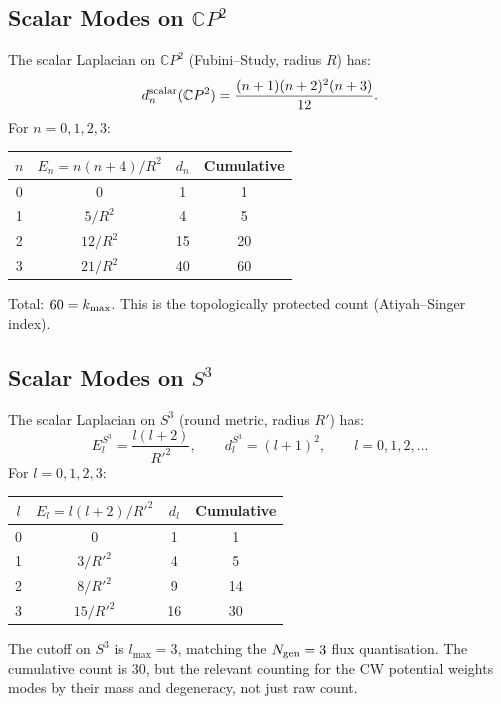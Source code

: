 \documentclass[11pt,a4paper]{article}
\newcommand{\CP}{\mathbb{C}P}
\newcommand{\kmax}{k_{\rm max}}
\newcommand{\Ngen}{N_{\rm gen}}
\begin{document}
\subsection{Scalar Modes on $\CP^2$}

The scalar Laplacian on $\CP^2$ (Fubini--Study, radius $R$) has:
\begin{equation}
d_n^{\rm scalar}(\CP^2) = \frac{(n+1)(n+2)^2(n+3)}{12}.
\end{equation}
For $n = 0,1,2,3$:

\begin{center}
\begin{tabular}{cccc}
\toprule
$n$ & $E_n = n(n+4)/R^2$ & $d_n$ & Cumulative \\
\midrule
0 & 0 & 1 & 1 \\
1 & $5/R^2$ & 4 & 5 \\
2 & $12/R^2$ & 15 & 20 \\
3 & $21/R^2$ & 40 & 60 \\
\bottomrule
\end{tabular}
\end{center}

Total: $60 = \kmax$. This is the topologically protected count
(Atiyah--Singer index).

\subsection{Scalar Modes on $S^3$}

The scalar Laplacian on $S^3$ (round metric, radius $R'$) has:
\begin{equation}
E_l^{S^3} = \frac{l(l+2)}{R'^2}, \qquad
d_l^{S^3} = (l+1)^2, \qquad l = 0, 1, 2, \ldots
\end{equation}
For $l = 0,1,2,3$:

\begin{center}
\begin{tabular}{cccc}
\toprule
$l$ & $E_l = l(l+2)/R'^2$ & $d_l$ & Cumulative \\
\midrule
0 & 0 & 1 & 1 \\
1 & $3/R'^2$ & 4 & 5 \\
2 & $8/R'^2$ & 9 & 14 \\
3 & $15/R'^2$ & 16 & 30 \\
\bottomrule
\end{tabular}
\end{center}

The cutoff on $S^3$ is $l_{\max} = 3$, matching the $\Ngen = 3$
flux quantisation. The cumulative count is 30, but the relevant
counting for the CW potential weights modes by their mass and
degeneracy, not just raw count.
\end{document}
